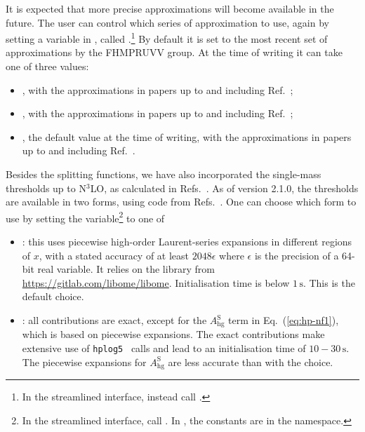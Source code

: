 It is expected that more precise approximations will become
available in the future.
%
The user can control which series of approximation to use, again by setting
a variable in , called
.\footnote{In the streamlined
  interface, instead call .}
%
By default it is set to the most recent set of approximations by
the FHMPRUVV group. At the time of writing it can take one of three values:
%
\begin{itemize}
\item {}, with the
  approximations in papers up to and including Ref.~\cite{Moch:2023tdj};
\item {}, with the
  approximations in papers up to and including
  Ref.~\cite{Falcioni:2024xyt};
\item {}, the default value at the time of
  writing, with the approximations in papers up to and including
  Ref.~\cite{Falcioni:2024qpd}.
\end{itemize}
Besides the splitting functions, we have also incorporated the
single-mass thresholds up to N$^3$LO, as calculated in
Refs.~\cite{Bierenbaum:2009mv,Ablinger:2010ty,Kawamura:2012cr,Blumlein:2012vq,ABLINGER2014263,Ablinger:2014nga,Ablinger:2014vwa,Behring:2014eya,Ablinger:2019etw,Behring:2021asx,Ablinger:2023ahe,Ablinger:2024xtt}.
%
As of version 2.1.0, the \ntlo thresholds are available in two forms,
using code from Refs.~\cite{BlumleinCode,Fael:2022miw}.
%
One can choose which form to use by setting the
 variable\footnote{%
  In the streamlined interface, call
  . In \CPP,
  the constants are in the  namespace.} to one of
\begin{itemize}
\item {}:
  this uses piecewise high-order Laurent-series expansions in different
  regions of $x$, with a stated accuracy of at least $2048\epsilon$
  where $\epsilon$ is the precision of a 64-bit real variable.
  It relies on the
   \CPP library from \url{https://gitlab.com/libome/libome}.
  Initialisation time is below $1\,\text{s}$.
  This is the default choice.
  
\item {}: all contributions are
  exact, except for the $A_\text{hg}^\text{S}$ term in
  Eq.~(\ref{eq:hp-nf1}), which is based on piecewise expansions.
  The exact contributions make extensive use of
  \texttt{hplog5}~\cite{FortranPolyLog} calls and lead to an
  initialisation time of $10{-}30\,\text{s}$.
  The piecewise expansions for $A_\text{hg}^\text{S}$ are less
  accurate than with the  choice.
\end{itemize}

